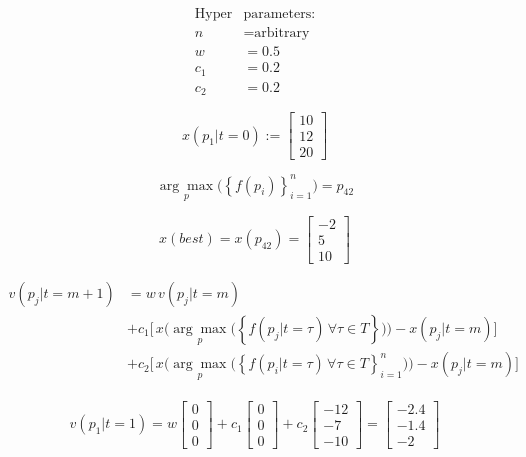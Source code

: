 \documentclass{minimal}
\begin{document}
	
	\begin{align}
		\text{Hyper}&\text{parameters:} \\
		n &= \text{arbitrary}\\
		w &= 0.5 \\
		c_1 &= 0.2 \\
		c_2 &= 0.2
	\end{align}
	
	\[x(p_1|t=0) := \begin{bmatrix} 10 \\ 12 \\ 20	\end{bmatrix}\]
	
	\[\underset{p}{\arg\max} \bigg( \left\{f(p_i) \right\}_{i=1}^n \bigg) = p_{42}\]
	
	\[x(best) = x(p_{42}) = \begin{bmatrix} -2 \\ 5 \\ 10	\end{bmatrix}\]
	
	\phantom{text}
	
	\begin{align}
		v(p_j|t=m+1) &= w\,v(p_j|t=m) \\
		&+ c_1 \bigg[ \, x\bigg( \underset{p}{\arg\max} \big( \left\{f(p_j|t=\tau)\,\forall \tau\in T \right\} \big) \bigg) - x(p_j|t=m) \bigg] \\
		&+ c_2 \bigg[ \, x\bigg( \underset{p}{\arg\max} \big( \left\{f(p_i|t=\tau)\,\forall \tau\in T \right\}_{i=1}^n \big) \bigg) - x(p_j|t=m) \bigg]
	\end{align}
	
	
	\begin{align*}
		v(p_1|t=1) = w \begin{bmatrix} 0 \\ 0 \\ 0	\end{bmatrix}
		+c_1 \begin{bmatrix} 0 \\ 0 \\ 0 \end{bmatrix}
		+ c_2\begin{bmatrix} -12 \\ -7 \\ -10	\end{bmatrix}
		= \begin{bmatrix} -2.4 \\-1.4 \\ -2	\end{bmatrix}
	\end{align*}
	
\end{document}
